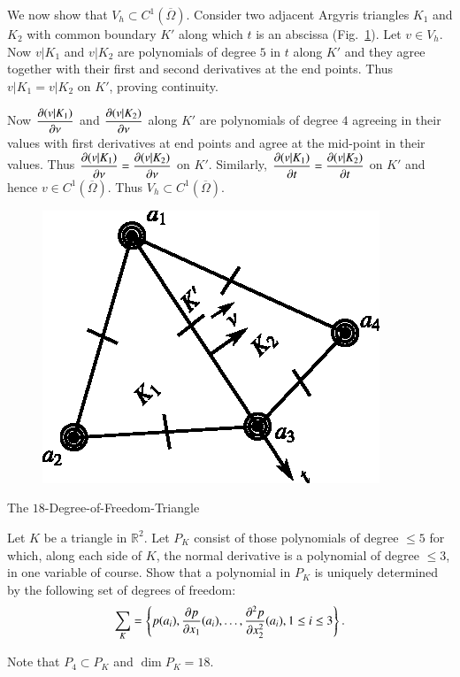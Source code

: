 \begin{example}
We now show that $V_{h}\subset C^{1}(\overline{\Omega})$. Consider two
adjacent Argyris triangles $K_{1}$ and $K_{2}$ with common boundary
$K'$ along which $t$ is an abscissa (Fig.~\ref{chap4-fig4.8}). Let
$v\in V_{h}$. Now $v|K_{1}$ and $v|K_{2}$ are polynomials of degree
$5$ in $t$ along $K'$ and they agree together with their first and
second derivatives at the end points. Thus $v|K_{1}=v|K_{2}$ on $K'$,
proving continuity.

Now $\dfrac{\partial(v|K_{1})}{\partial\nu}$ and $\dfrac{\partial(v|K_{2})}{\partial \nu}$
along $K'$ are polynomials of degree $4$ agreeing in their values with
first derivatives at end points and agree at the mid-point in their
values. Thus $\dfrac{\partial(v|K_{1})}{\partial \nu}=\dfrac{\partial(v|K_{2})}{\partial \nu}$
on $K'$. Similarly, $\dfrac{\partial (v|K_{1})}{\partial t}=\dfrac{\partial
  (v|K_{2})}{\partial t}$ on $K'$ and hence $v\in
C^{1}(\overline{\Omega})$. Thus $V_{h}\subset
C^{1}(\overline{\Omega})$. 
\begin{figure}[H]
\centering
\includegraphics{figure/fig4.8.eps}
\caption{}\label{chap4-fig4.8}
\end{figure}
\end{example}

\begin{exercise}\label{chap4-exer4.7}
The $18$-Degree-of-Freedom-Triangle

Let $K$ be a triangle in $\mathbb{R}^{2}$. Let $P_{K}$ consist of
those polynomials of degree $\leq 5$ for which, along each side of
$K$, the normal derivative is a polynomial of degree $\leq 3$, in one
variable of course. Show that a polynomial in $P_{K}$ is uniquely
determined by the following set of degrees of freedom:
$$
\sum_{K}=\left\{p(a_{i}),\frac{\partial p}{\partial
  x_{1}}(a_{i}),\ldots,\frac{\partial^{2}p}{\partial x^{2}_{2}}(a_{i}),1\leq i\leq
3\right\}. 
$$\pageoriginale

Note that $P_{4}\subset P_{K}$ and $\dim P_{K}=18$.
\end{exercise}

